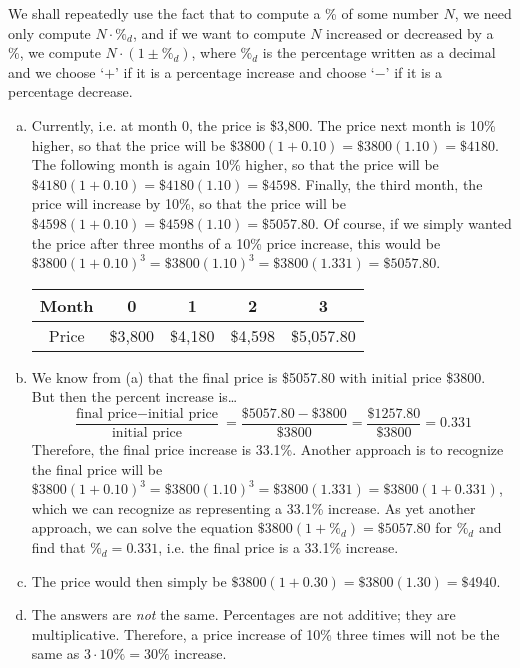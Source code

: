 \documentclass[11pt,letterpaper]{article}
\begin{document}
{\small
\sol We shall repeatedly use the fact that to compute a \% of some number $N$, we need only compute $N \cdot \%_d$, and if we want to compute $N$ increased or decreased by a \%, we compute $N \cdot (1 \pm \%_d)$, where $\%_d$ is the percentage written as a decimal and we choose `$+$' if it is a percentage increase and choose `$-$' if it is a percentage decrease. \pspace

\begin{enumerate}[(a)]
\item Currently, i.e. at month 0, the price is \$3,800. The price next month is 10\% higher, so that the price will be $\$3800(1 + 0.10)= \$3800(1.10)= \$4180$. The following month is again 10\% higher, so that the price will be $\$4180(1 + 0.10)= \$4180(1.10)= \$4598$. Finally, the third month, the price will increase by 10\%, so that the price will be $\$4598(1 + 0.10)= \$4598(1.10)= \$5057.80$. Of course, if we simply wanted the price after three months of a 10\% price increase, this would be $\$3800(1 + 0.10)^3= \$3800(1.10)^3= \$3800(1.331)= \$5057.80$. \par
	\begin{table}[h]
	\centering
	\begin{tabular}{c||cccc}
	Month & 0 & 1 & 2 & 3 \\ \hline
	Price & \$3,800 & \$4,180 & \$4,598 & \$5,057.80 
	\end{tabular}
	\end{table} \par

\item We know from (a) that the final price is \$5057.80 with initial price \$3800. But then the percent increase is\dots
	\[
	\dfrac{\text{final price} - \text{initial price}}{\text{initial price}}= \dfrac{\$5057.80 - \$3800}{\$3800}= \dfrac{\$1257.80}{\$3800}= 0.331
	\]
Therefore, the final price increase is 33.1\%. Another approach is to recognize the final price will be $\$3800(1 + 0.10)^3= \$3800(1.10)^3= \$3800(1.331)= \$3800(1 + 0.331)$, which we can recognize as representing a 33.1\% increase. As yet another approach, we can solve the equation $\$3800(1 + \%_d)= \$5057.80$ for $\%_d$ and find that $\%_d= 0.331$, i.e. the final price is a 33.1\% increase. 

\item The price would then simply be $\$3800(1 + 0.30)= \$3800(1.30)= \$4940$. 

\item The answers are \textit{not} the same. Percentages are not additive; they are multiplicative. Therefore, a price increase of 10\% three times will not be the same as $3 \cdot 10\%= 30\%$ increase. 


\end{enumerate}}
\end{document}
